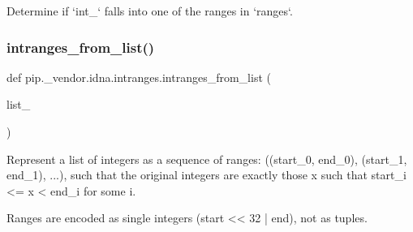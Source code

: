 \begin{DoxyVerb}Determine if `int_` falls into one of the ranges in `ranges`.\end{DoxyVerb}
 \mbox{\label{namespacepip_1_1__vendor_1_1idna_1_1intranges_a418221786b0d94e50db7779ad9ea5735}} 
\subsubsection{\texorpdfstring{intranges\+\_\+from\+\_\+list()}{intranges\_from\_list()}}
{\footnotesize\ttfamily def pip.\+\_\+vendor.\+idna.\+intranges.\+intranges\+\_\+from\+\_\+list (\begin{DoxyParamCaption}\item[{}]{list\+\_\+ }\end{DoxyParamCaption})}

\begin{DoxyVerb}Represent a list of integers as a sequence of ranges:
((start_0, end_0), (start_1, end_1), ...), such that the original
integers are exactly those x such that start_i <= x < end_i for some i.

Ranges are encoded as single integers (start << 32 | end), not as tuples.
\end{DoxyVerb}
 